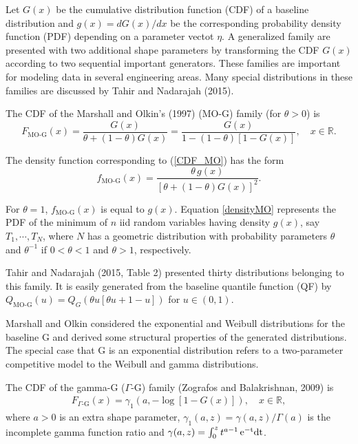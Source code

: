 \documentclass[12pt,a4paper]{article} %
\begin{document}
Let $G(x)$ be the cumulative distribution function (CDF) of a
baseline distribution and $g(x)=dG(x)/dx$ be the corresponding  probability density function (PDF) depending on a
parameter vectot $\eta$. A generalized family are presented
with two additional shape parameters by transforming the CDF $G(x)$
according to two sequential important gene\-rators. These families are important for modeling data
in several engineering areas. Many special distributions in these families are discussed by Tahir
and Nadarajah (2015).


The CDF of the Marshall and Olkin's (1997) ($\text{MO-G}$) family (for $\theta>0$) is
\begin{equation}\label{CDF_MO}
F_{\text{MO-G}}(x)=\frac{G(x)}{\theta+(1-\theta)G(x)}=\frac{G(x)}{1-(1-\theta)[1-G(x)]},\quad x \in \mathbb{R}.
\end{equation}

The density function corresponding to (\ref{CDF_MO}) has the form
\begin{equation}\label{densityMO}
f_{\text{MO-G}}(x)=\frac{\theta\, g(x)}{[\theta+(1-\theta)G(x)]^{2}}.
\end{equation}

For $\theta=1$, $f_{\text{MO-G}}(x)$ is equal to $g(x)$. 
Equation \eqref{densityMO} represents the PDF of the minimum of $n$ iid random variables having density $g(x)$, say $T_1,\cdots,T_N$, 
where $N$ has a geometric distribution with probability parameters $\theta$ and $\theta^{-1}$ if $0<\theta<1$ and $\theta>1$, 
respectively.

Tahir and Nadarajah (2015, Table 2) presented thirty distributions
belonging to this family. It is easily generated from the baseline quantile function (QF) by
$Q_{\text{MO-G}}(u)=Q_{G}\left(\theta u \left[\theta u+1-u\right]\right)$ for $u\in(0,1)$.

Marshall and Olkin considered the exponential and Weibull distributions for the baseline G and derived some
structural properties of the generated distributions. The special case that G is an exponential distribution
refers to a two-parameter competitive model to the Weibull and gamma distributions.

The CDF of the gamma-G ($\Gamma$-G) family (Zografos and Balakrishnan, 2009) is
\begin{eqnarray}\label{CDF_Ga}
F_{\Gamma\text{-G}}(x)=\gamma_1\left( a, -\log \left[1-G(x)\right]\right), \quad x \in \mathbb{R},
\end{eqnarray}
where $a>0$ is an extra shape parameter,  $\gamma_1(a,z)= \gamma(a,z)/\Gamma(a)$ is the incomplete gamma function ratio
and $\gamma(a,z)=\int_0^{z} t^{a-1}\,\rm{e}^{-t}dt$.
\end{document}
